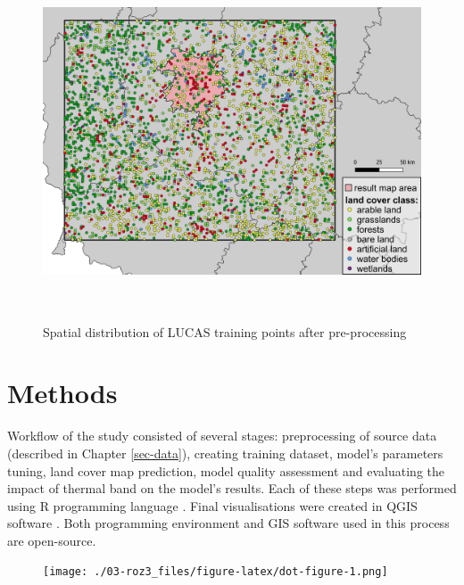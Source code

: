 \documentclass{amuthesis}
\begin{document}
\begin{figure}[t]

{\centering \includegraphics[width=1\textwidth,height=4.16667in]{./figures/lucas_distribution.png}

}

\caption{\label{fig-rycina3}Spatial distribution of LUCAS training
points after pre-processing}

\end{figure}


\hypertarget{sec-methods}{%
\chapter{Methods}\label{sec-methods}}

Workflow of the study consisted of several stages: preprocessing of
source data (described in Chapter \ref{sec-data}), creating training
dataset, model's parameters tuning, land cover map prediction, model
quality assessment and evaluating the impact of thermal band on the
model's results. Each of these steps was performed using R programming
language \autocite{R-base}. Final visualisations were created in QGIS
software \autocite{qgis_development_team_qgis_2009}. Both programming
environment and GIS software used in this process are open-source.

\begin{figure}[H]

{\centering \texttt{[image: ./03-roz3\_files/figure-latex/dot-figure-1.png]}

}

\end{figure}
\end{document}
